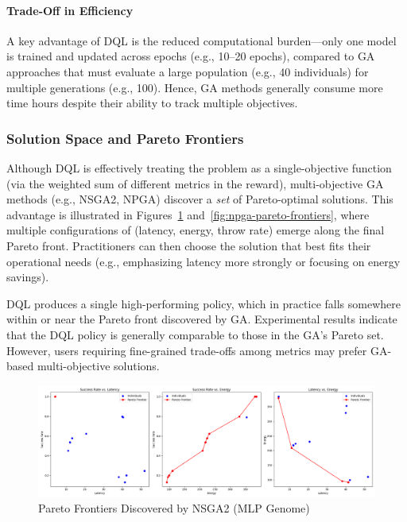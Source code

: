 \documentclass[preprint,3p,authoryear]{elsarticle}
\begin{document}


\paragraph{Trade-Off in Efficiency}
A key advantage of DQL is the reduced computational burden—only one model is trained and updated across epochs (e.g., 10–20 epochs), compared to GA approaches that must evaluate a large population (e.g., 40 individuals) for multiple generations (e.g., 100). Hence, GA methods generally consume more time hours despite their ability to track multiple objectives.

\subsubsection{Solution Space and Pareto Frontiers}
Although DQL is effectively treating the problem as a single-objective function (via the weighted sum of different metrics in the reward), multi-objective GA methods (e.g., NSGA2, NPGA) discover a \emph{set} of Pareto-optimal solutions. This advantage is illustrated in Figures~\ref{fig:nsga2-pareto-frontiers} and~\ref{fig:npga-pareto-frontiers}, where multiple configurations of (latency, energy, throw rate) emerge along the final Pareto front. Practitioners can then choose the solution that best fits their operational needs (e.g., emphasizing latency more strongly or focusing on energy savings).

DQL produces a single high-performing policy, which in practice falls somewhere within or near the Pareto front discovered by GA. Experimental results indicate that the DQL policy is generally comparable to those in the GA’s Pareto set. However, users requiring fine-grained trade-offs among metrics may prefer GA-based multi-objective solutions.

\begin{figure}[H]
    \centering
    \includegraphics[width=0.9\linewidth]{figs/pareto_frontiers_nsga2.png}
    \caption{Pareto Frontiers Discovered by NSGA2 (MLP Genome)}
    \label{fig:nsga2-pareto-frontiers}
\end{figure}
\end{document}
